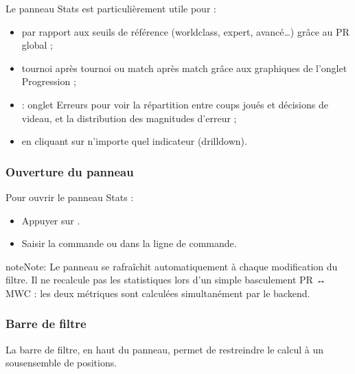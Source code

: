 \documentclass[letterpaper,10pt,french]{sphinxmanual}
\begin{document}
\sphinxAtStartPar
Le panneau Stats est particulièrement utile pour :
\begin{itemize}
\item {} 
\sphinxAtStartPar
{} par rapport aux seuils de référence (world\sphinxhyphen{}class,
expert, avancé…) grâce au PR global ;

\item {} 
\sphinxAtStartPar
{} tournoi après tournoi ou match après match grâce
aux graphiques de l’onglet Progression ;

\item {} 
\sphinxAtStartPar
{} : onglet Erreurs pour voir la répartition
entre coups joués et décisions de videau, et la distribution des magnitudes
d’erreur ;

\item {} 
\sphinxAtStartPar
{} en cliquant sur n’importe
quel indicateur (drill\sphinxhyphen{}down).

\end{itemize}


\subsubsection{Ouverture du panneau}
\label{\detokenize{manuel:ouverture-du-panneau}}
\sphinxAtStartPar
Pour ouvrir le panneau Stats :
\begin{itemize}
\item {} 
\sphinxAtStartPar
Appuyer sur .

\item {} 
\sphinxAtStartPar
Saisir la commande  ou  dans la ligne de commande.

\end{itemize}

\begin{sphinxadmonition}{note}{Note:}
\sphinxAtStartPar
Le panneau se rafraîchit automatiquement à chaque modification du filtre.
Il ne recalcule pas les statistiques lors d’un simple basculement PR ↔ MWC :
les deux métriques sont calculées simultanément par le backend.
\end{sphinxadmonition}


\subsubsection{Barre de filtre}
\label{\detokenize{manuel:barre-de-filtre}}
\sphinxAtStartPar
La barre de filtre, en haut du panneau, permet de restreindre le calcul à un
sous\sphinxhyphen{}ensemble de positions.
\end{document}
